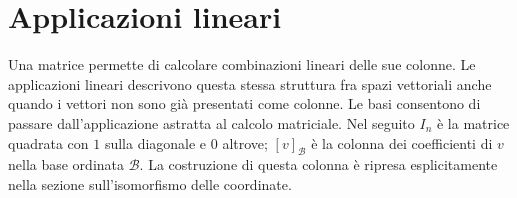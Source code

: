 \chapter{Applicazioni lineari}
\label{cap:applicazioni-lineari}

Una matrice permette di calcolare combinazioni lineari delle sue colonne. Le applicazioni lineari descrivono questa stessa struttura fra spazi vettoriali anche quando i vettori non sono già presentati come colonne. Le basi consentono di passare dall'applicazione astratta al calcolo matriciale.
Nel seguito $I_n$ è la matrice quadrata con $1$ sulla diagonale e $0$ altrove; $[v]_{\mathcal B}$ è la colonna dei coefficienti di $v$ nella base ordinata $\mathcal B$. La costruzione di questa colonna è ripresa esplicitamente nella sezione sull’isomorfismo delle coordinate.





